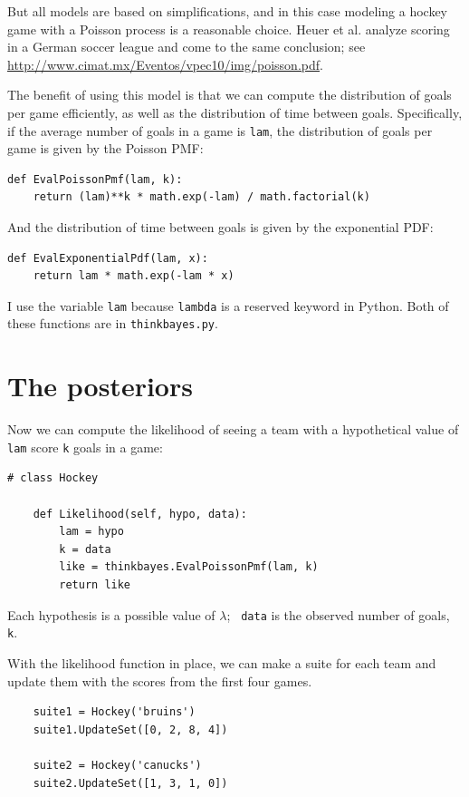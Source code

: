 \documentclass[12pt]{book}
\begin{document}
But all models are based on simplifications, and in this case modeling
a hockey game with a Poisson process is a reasonable choice.  Heuer
et al. analyze scoring in a German soccer league and come to the same
conclusion; see
\url{http://www.cimat.mx/Eventos/vpec10/img/poisson.pdf}.

The benefit of using this model is that we can compute the distribution
of goals per game efficiently, as well as the distribution of time
between goals.  Specifically, if the average number of goals
in a game is {\tt lam}, the distribution of goals per game is
given by the Poisson PMF:

\begin{verbatim}
def EvalPoissonPmf(lam, k):
    return (lam)**k * math.exp(-lam) / math.factorial(k)
\end{verbatim}  

And the distribution of time between goals is given by the
exponential PDF:

\begin{verbatim}
def EvalExponentialPdf(lam, x):
    return lam * math.exp(-lam * x)
\end{verbatim}  

I use the variable
{\tt lam} because {\tt lambda} is a reserved keyword in Python.
Both of these functions are in \verb"thinkbayes.py".


\section{The posteriors}

Now we can compute the likelihood of seeing a team with a hypothetical
value of {\tt lam} score {\tt k} goals in a game:

\begin{verbatim}
# class Hockey

    def Likelihood(self, hypo, data):
        lam = hypo
        k = data
        like = thinkbayes.EvalPoissonPmf(lam, k)
        return like
\end{verbatim}

Each hypothesis is a possible value of $\lambda$;  {\tt
  data} is the observed number of goals, {\tt k}.

With the likelihood function in place, we can make a suite for each
team and update them with the scores from the first four games.

\begin{verbatim}
    suite1 = Hockey('bruins')
    suite1.UpdateSet([0, 2, 8, 4])
     
    suite2 = Hockey('canucks')
    suite2.UpdateSet([1, 3, 1, 0])
\end{verbatim}  
\end{document}
